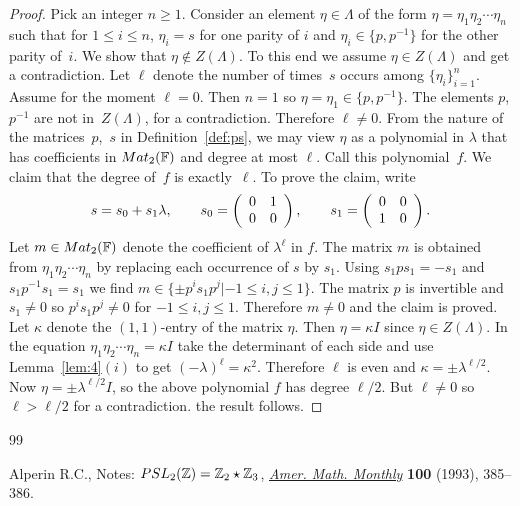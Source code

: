\documentclass[10pt,a4paper]{amsart}
\begin{document}
\begin{proof}
Pick an integer $n\geq 1$.
Consider an element $\eta \in \Lambda $
of the form
$\eta =\eta_1 \eta_2 \cdots \eta_n$ such that
 for $1 \leq i \leq n$,  $\eta_i=s$
for one parity of $i$ and
$\eta_i \in \lbrace p,p^{-1} \rbrace$ for the other parity of~$i$.
We show that $\eta \not\in Z(\Lambda)$.
To this end we assume
 $\eta \in Z(\Lambda )$ and get a contradiction.
Let $\ell$ denote the number of times~$s$ occurs among
$\lbrace \eta_i\rbrace_{i=1}^n$.
Assume for the moment $\ell = 0$.
Then $n=1$ so
$\eta =\eta_1 \in \lbrace p, p^{-1}\rbrace$.
The elements $p$, $p^{-1}$ are not in~$Z(\Lambda)$, for a contradiction.
Therefore $\ell \neq 0$.
From the nature of the matrices~$p$,~$s$ in Def\/inition~\ref{def:ps},
we may
view $\eta $ as a polynomial in $\lambda$
that has
coef\/f\/icients in
${\rm {Mat}}_2(\mathbb F)$ and degree at most $\ell$.
Call this polynomial~$f$.
We claim that the degree of~$f$ is exactly~$\ell$.
To prove the claim,
write
\begin{gather*}
s = s_0+ s_1 \lambda,   \qquad
s_0= \left(
\begin{array}{  c c}
0 & 1  \\
0 & 0
\end{array}
\right),
\qquad
s_1= \left(
\begin{array}{  c c}
0 & 0  \\
1 & 0
\end{array}
\right).
\end{gather*}
Let $m
\in {\rm {Mat}}_2(\mathbb F)$ denote the coef\/f\/icient of
$\lambda^\ell$ in $f$.
The matrix $m$ is obtained from
$\eta_1 \eta_2\cdots \eta_n$ by
replacing each occurrence of $s$ by $s_1$.
Using $s_1p s_1=-s_1$ and
 $s_1p^{-1} s_1=s_1$  we f\/ind
$m\in \lbrace \pm p^i s_1 p^j |
-1 \leq i,j\leq 1\rbrace $. The matrix $p$ is invertible
and $s_1\not=0$ so
$p^i s_1 p^j\not=0$ for $-1 \leq i,j \leq 1$.
Therefore $m\not=0$ and the claim is proved.
Let $\kappa $ denote the $(1,1)$-entry of the matrix $\eta $.
Then $\eta=\kappa I$ since $\eta \in Z(\Lambda )$.
In the equation
$\eta_1 \eta_2\cdots \eta_n=\kappa I$ take the determinant of
each side and use
Lemma~\ref{lem:4}$(i)$
to get $(-\lambda)^\ell = \kappa^2$.
Therefore $\ell $ is even and
$\kappa=\pm \lambda^{\ell/2}$.
Now $\eta =\pm \lambda^{\ell/2} I$, so
the above polynomial $f$ has degree $\ell/2$.
But $\ell \not=0$ so $\ell > \ell/2$
for a contradiction.
the result follows.
\end{proof}

\begin{thebibliography}{99}

\footnotesize\itemsep=0pt
Alperin R.C.,
Notes: ${\rm  {PSL}}_2(\mathbb Z)= \mathbb Z_2 \star \mathbb Z_3$,
\href{http://dx.doi.org/10.2307/2324963}{{\it Amer. Math. Monthly}} {\bf 100} (1993), 385--386.
\end{thebibliography}
\end{document}
